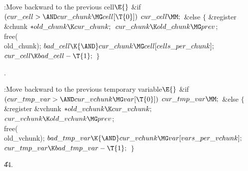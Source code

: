 \B{}:Move  backward to the previous cell\X${}\E{}$\6
\&{if} ${}(\\{cur\_cell}>{\AND}\\{cur\_chunk}\MG\\{cell}[\T{0}]){}$\1\5
${}\\{cur\_cell}\MM;{}$\2\6
\&{else}\5
${}\{{}$\1\6
\&{register} \&{chunk} ${}{*}\\{old\_chunk}\K\\{cur\_chunk};{}$\7
${}\\{cur\_chunk}\K\\{old\_chunk}\MG\\{prev}{}$;\5
\\{free}(\\{old\_chunk});\6
${}\\{bad\_cell}\K{\AND}\\{cur\_chunk}\MG\\{cell}[\\{cells\_per\_chunk}];{}$\6
${}\\{cur\_cell}\K\\{bad\_cell}-\T{1};{}$\6
\4${}\}{}$\2\par
{}.\fi

\B{}:Move  backward to the previous temporary
variable\X${}\E{}$\6
\&{if} ${}(\\{cur\_tmp\_var}>{\AND}\\{cur\_vchunk}\MG\\{var}[\T{0}]){}$\1\5
${}\\{cur\_tmp\_var}\MM;{}$\2\6
\&{else}\5
${}\{{}$\1\6
\&{register} \&{vchunk} ${}{*}\\{old\_vchunk}\K\\{cur\_vchunk};{}$\7
${}\\{cur\_vchunk}\K\\{old\_vchunk}\MG\\{prev}{}$;\5
\\{free}(\\{old\_vchunk});\6
${}\\{bad\_tmp\_var}\K{\AND}\\{cur\_vchunk}\MG\\{var}[\\{vars\_per%
\_vchunk}];{}$\6
${}\\{cur\_tmp\_var}\K\\{bad\_tmp\_var}-\T{1};{}$\6
\4${}\}{}$\2\par
\U44.\fi

